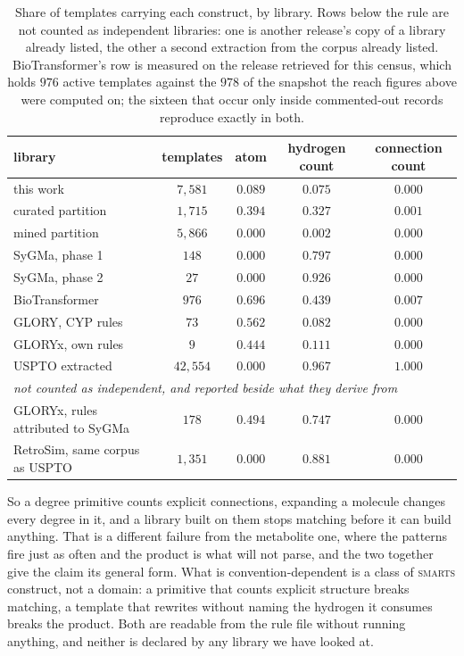 \begin{table}[h]
\caption{Share of templates carrying each construct, by library.
Rows below the rule are not counted as independent libraries: one is another release's copy of a
library already listed, the other a second extraction from the corpus already listed.
BioTransformer's row is measured on the release retrieved for this census, which holds $976$ active
templates against the $978$ of the snapshot the reach figures above were computed on; the sixteen
that occur only inside commented-out records reproduce exactly in both.}
\label{tab:census}
\begin{center}
\footnotesize
\renewcommand{\arraystretch}{0.95}
\begin{tabular}{lcccc}
\toprule
library & templates & atom & hydrogen count & connection count \\
\midrule
this work & $7{,}581$ & $0.089$ & $0.075$ & $0.000$ \\
\quad curated partition & $1{,}715$ & $0.394$ & $0.327$ & $0.001$ \\
\quad mined partition & $5{,}866$ & $0.000$ & $0.002$ & $0.000$ \\
SyGMa, phase 1 & $148$ & $0.000$ & $0.797$ & $0.000$ \\
SyGMa, phase 2 & $27$ & $0.000$ & $0.926$ & $0.000$ \\
BioTransformer & $976$ & $0.696$ & $0.439$ & $0.007$ \\
GLORY, CYP rules & $73$ & $0.562$ & $0.082$ & $0.000$ \\
GLORYx, own rules & $9$ & $0.444$ & $0.111$ & $0.000$ \\
USPTO extracted & $42{,}554$ & $0.000$ & $0.967$ & $1.000$ \\
\midrule
\multicolumn{5}{l}{\emph{not counted as independent, and reported beside what they derive from}} \\
GLORYx, rules attributed to SyGMa & $178$ & $0.494$ & $0.747$ & $0.000$ \\
RetroSim, same corpus as USPTO & $1{,}351$ & $0.000$ & $0.881$ & $0.000$ \\
\bottomrule
\end{tabular}
\end{center}
\end{table}


So a degree primitive counts explicit connections, expanding a molecule changes every degree in it,
and a library built on them stops matching before it can build anything. That is a different failure
from the metabolite one, where the patterns fire just as often and the product is what will not
parse, and the two together give the claim its general form. What is convention-dependent is a class
of \textsc{smarts} construct, not a domain: a primitive that counts explicit structure breaks
matching, a template that rewrites without naming the hydrogen it consumes breaks the product. Both
are readable from the rule file without running anything, and neither is declared by any library we
have looked at.

